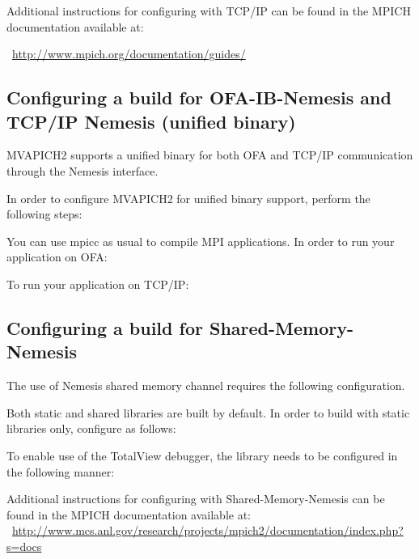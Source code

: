 Additional instructions for configuring with TCP/IP can be found in the MPICH
documentation available at:

~\href{http://www.mpich.org/documentation/guides/}{http://www.mpich.org/documentation/guides/}

\subsection{Configuring a build for OFA-IB-Nemesis and TCP/IP Nemesis
(unified binary)}
\label{subsec:config-tcpip_nemesis-and-ofa_nemesis}

MVAPICH2 supports a unified binary for both OFA and TCP/IP communication
through the Nemesis interface.

In order to configure MVAPICH2 for unified binary support, perform the
following steps:


You can use mpicc as usual to compile MPI applications. In order to
run your application on OFA:


To run your application on TCP/IP:


\subsection{Configuring a build for Shared-Memory-Nemesis}
\label{subsec:config-smp_nemesis}

The use of Nemesis shared memory channel requires the following
configuration.


Both static and shared libraries are built by default. In order to build with static libraries only, configure as follows:


To enable use of the TotalView debugger, the library needs to be configured
in the following manner:


Additional instructions for configuring with Shared-Memory-Nemesis can be found in the MPICH
documentation available at: \\
~\href{http://www.mcs.anl.gov/research/projects/mpich2/documentation/index.php?s=docs}{http://www.mcs.anl.gov/research/projects/mpich2/documentation/index.php?s=docs}

